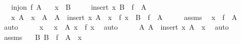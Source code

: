 \begin{isabellebody}
\ \ \ {\isachardoublequoteopen}inj{\isacharunderscore}{\kern0pt}on\ f\ A{\isachardoublequoteclose}\isanewline
\ \ \ {\isachardoublequoteopen}x\ {\isasymnotin}\ B{\isachardoublequoteclose}\isanewline
\ \ \ \ \ {\isachardoublequoteopen}insert\ x\ B\ {\isacharequal}{\kern0pt}\ f\ {\isacharbackquote}{\kern0pt}\ A{\isachardoublequoteclose}\isanewline
\ \ \ x{\isacharprime}{\kern0pt}\ A{\isacharprime}{\kern0pt}\ \ {\isachardoublequoteopen}x{\isacharprime}{\kern0pt}\ {\isasymnotin}\ A{\isacharprime}{\kern0pt}{\isachardoublequoteclose}\ \ {\isachardoublequoteopen}A\ {\isacharequal}{\kern0pt}\ insert\ x{\isacharprime}{\kern0pt}\ A{\isacharprime}{\kern0pt}{\isachardoublequoteclose}\ \ {\isachardoublequoteopen}x\ {\isacharequal}{\kern0pt}\ f\ x{\isacharprime}{\kern0pt}{\isachardoublequoteclose}\ \ {\isachardoublequoteopen}B\ {\isacharequal}{\kern0pt}\ f\ {\isacharbackquote}{\kern0pt}\ A{\isacharprime}{\kern0pt}{\isachardoublequoteclose}\isanewline
%
\isadelimproof
%
\endisadelimproof
%
\isatagproof
{}\isamarkupfalse%
\ {\isacharminus}{\kern0pt}\isanewline
\ \ \isamarkupfalse%
\ assms\ \isamarkupfalse%
\ {\isachardoublequoteopen}x\ {\isasymin}\ f\ {\isacharbackquote}{\kern0pt}\ A{\isachardoublequoteclose}\ \isamarkupfalse%
\ auto\isanewline
\ \ \isamarkupfalse%
\ \isamarkupfalse%
\ x{\isacharprime}{\kern0pt}\ \ {\isacharasterisk}{\kern0pt}{\isacharcolon}{\kern0pt}\ {\isachardoublequoteopen}x{\isacharprime}{\kern0pt}\ {\isasymin}\ A{\isachardoublequoteclose}\ {\isachardoublequoteopen}x\ {\isacharequal}{\kern0pt}\ f\ x{\isacharprime}{\kern0pt}{\isachardoublequoteclose}\ \isamarkupfalse%
\ auto\isanewline
\ \ \isamarkupfalse%
\ \isamarkupfalse%
\ A{\isacharcolon}{\kern0pt}\ {\isachardoublequoteopen}A\ {\isacharequal}{\kern0pt}\ insert\ x{\isacharprime}{\kern0pt}\ {\isacharparenleft}{\kern0pt}A\ {\isacharminus}{\kern0pt}\ {\isacharbraceleft}{\kern0pt}x{\isacharprime}{\kern0pt}{\isacharbraceright}{\kern0pt}{\isacharparenright}{\kern0pt}{\isachardoublequoteclose}\ \isamarkupfalse%
\ auto\isanewline
\ \ \isamarkupfalse%
\ assms\ {\isacharasterisk}{\kern0pt}\ \isamarkupfalse%
\ B{\isacharcolon}{\kern0pt}\ {\isachardoublequoteopen}B\ {\isacharequal}{\kern0pt}\ f\ {\isacharbackquote}{\kern0pt}\ {\isacharparenleft}{\kern0pt}A\ {\isacharminus}{\kern0pt}\ {\isacharbraceleft}{\kern0pt}x{\isacharprime}{\kern0pt}{\isacharbraceright}{\kern0pt}{\isacharparenright}{\kern0pt}{\isachardoublequoteclose}\ \isamarkupfalse%

\end{isabellebody}
